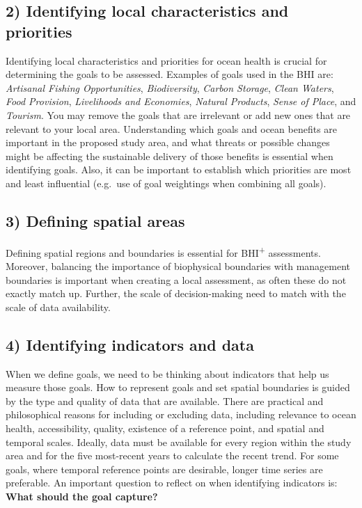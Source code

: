 \documentclass[
]{book}
\begin{document}
\hypertarget{identifying-local-characteristics-and-priorities}{%
\subsection*{2) Identifying local characteristics and priorities}\label{identifying-local-characteristics-and-priorities}}

Identifying local characteristics and priorities for ocean health is crucial for determining the goals to be assessed. Examples of goals used in the BHI are: \emph{Artisanal Fishing Opportunities}, \emph{Biodiversity}, \emph{Carbon Storage}, \emph{Clean Waters}, \emph{Food Provision}, \emph{Livelihoods and Economies}, \emph{Natural Products}, \emph{Sense of Place}, and \emph{Tourism}. You may remove the goals that are irrelevant or add new ones that are relevant to your local area. Understanding which goals and ocean benefits are important in the proposed study area, and what threats or possible changes might be affecting the sustainable delivery of those benefits is essential when identifying goals. Also, it can be important to establish which priorities are most and least influential (e.g.~use of goal weightings when combining all goals).

\hypertarget{defining-spatial-areas}{%
\subsection*{3) Defining spatial areas}\label{defining-spatial-areas}}

Defining spatial regions and boundaries is essential for BHI\textsuperscript{+} assessments. Moreover, balancing the importance of biophysical boundaries with management boundaries is important when creating a local assessment, as often these do not exactly match up. Further, the scale of decision-making need to match with the scale of data availability.

\hypertarget{identifying-indicators-and-data}{%
\subsection*{4) Identifying indicators and data}\label{identifying-indicators-and-data}}

When we define goals, we need to be thinking about indicators that help us measure those goals. How to represent goals and set spatial boundaries is guided by the type and quality of data that are available. There are practical and philosophical reasons for including or excluding data, including relevance to ocean health, accessibility, quality, existence of a reference point, and spatial and temporal scales. Ideally, data must be available for every region within the study area and for the five most-recent years to calculate the recent trend. For some goals, where temporal reference points are desirable, longer time series are preferable. An important question to reflect on when identifying indicators is: \textbf{What should the goal capture?}
\end{document}
